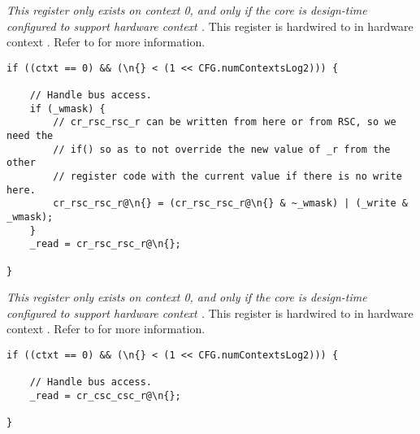 
\emph{This register only exists on context 0, and only if the core is
design-time configured to support hardware context \n{}.} This register is 
hardwired to  in hardware context \n{}. Refer to  for more
information.

\implementation{}
\begin{lstlisting}
if ((ctxt == 0) && (\n{} < (1 << CFG.numContextsLog2))) {
    
    // Handle bus access.
    if (_wmask) {
        // cr_rsc_rsc_r can be written from here or from RSC, so we need the
        // if() so as to not override the new value of _r from the other
        // register code with the current value if there is no write here.
        cr_rsc_rsc_r@\n{} = (cr_rsc_rsc_r@\n{} & ~_wmask) | (_write & _wmask);
    }
    _read = cr_rsc_rsc_r@\n{};
    
}
\end{lstlisting}


\emph{This register only exists on context 0, and only if the core is
design-time configured to support hardware context \n{}.} This register is 
hardwired to  in hardware context \n{}. Refer to  for more
information.

\implementation{}
\begin{lstlisting}
if ((ctxt == 0) && (\n{} < (1 << CFG.numContextsLog2))) {
    
    // Handle bus access.
    _read = cr_csc_csc_r@\n{};
    
}
\end{lstlisting}

